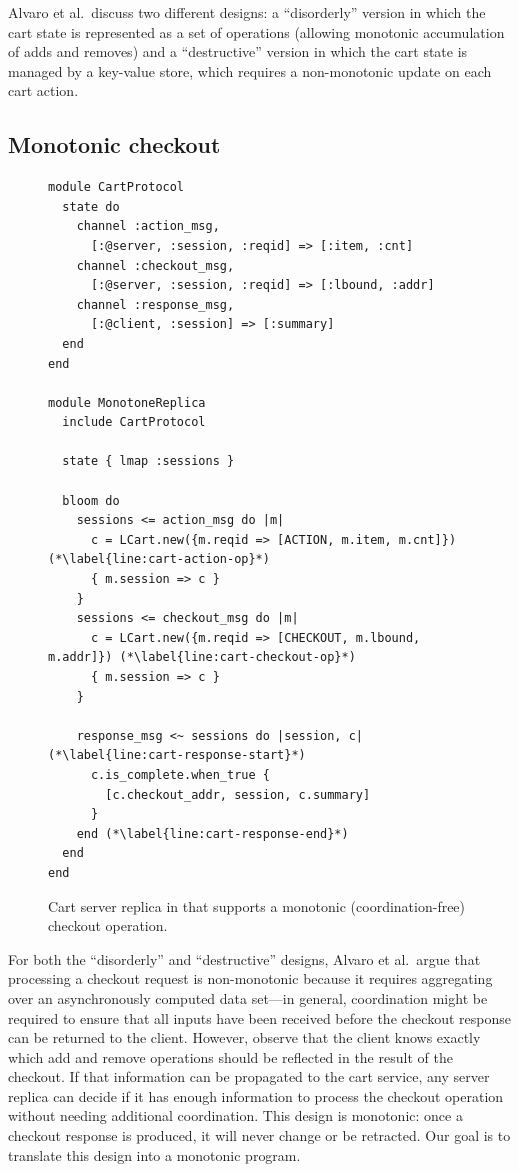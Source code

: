 Alvaro et al.\ discuss two different designs: a ``disorderly'' version in which
the cart state is represented as a set of operations (allowing monotonic
accumulation of adds and removes) and a ``destructive'' version in which the
cart state is managed by a key-value store, which requires a non-monotonic
update on each cart action.

\subsection{Monotonic checkout}
\label{sec:monotone-checkout}

\begin{figure}[t]
\begin{scriptsize}
\begin{lstlisting}
module CartProtocol
  state do
    channel :action_msg,
      [:@server, :session, :reqid] => [:item, :cnt]
    channel :checkout_msg,
      [:@server, :session, :reqid] => [:lbound, :addr]
    channel :response_msg,
      [:@client, :session] => [:summary]
  end
end

module MonotoneReplica
  include CartProtocol

  state { lmap :sessions }

  bloom do
    sessions <= action_msg do |m|
      c = LCart.new({m.reqid => [ACTION, m.item, m.cnt]}) (*\label{line:cart-action-op}*)
      { m.session => c }
    }
    sessions <= checkout_msg do |m|
      c = LCart.new({m.reqid => [CHECKOUT, m.lbound, m.addr]}) (*\label{line:cart-checkout-op}*)
      { m.session => c }
    }

    response_msg <~ sessions do |session, c| (*\label{line:cart-response-start}*)
      c.is_complete.when_true {
        [c.checkout_addr, session, c.summary]
      }
    end (*\label{line:cart-response-end}*)
  end
end
\end{lstlisting}
\end{scriptsize}
\caption{Cart server replica in \lang that supports a monotonic
  (coordination-free) checkout operation.}
\label{fig:monotone-cart}
\end{figure}

For both the ``disorderly'' and ``destructive'' designs, Alvaro et al.\ argue
that processing a checkout request is non-monotonic because it requires
aggregating over an asynchronously computed data set---in general, coordination
might be required to ensure that all inputs have been received before the
checkout response can be returned to the client. However, observe that the
client knows exactly which add and remove operations should be reflected in the
result of the checkout. If that information can be propagated to the cart
service, any server replica can decide if it has enough information to process
the checkout operation without needing additional coordination. This design is
monotonic: once a checkout response is produced, it will never change or be
retracted. Our goal is to translate this design into a monotonic \lang program.

